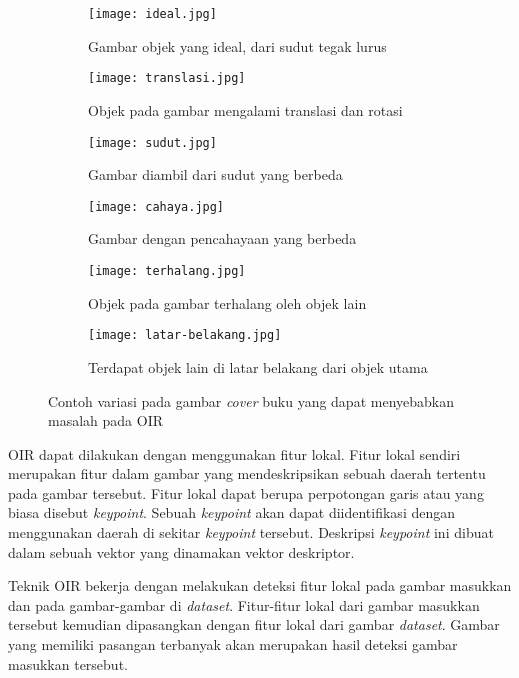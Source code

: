 \begin{figure}[H]
	\centering %
	\begin{subfigure}{0.3\textwidth}
		\texttt{[image: ideal.jpg]}
		\caption{Gambar objek yang ideal, dari sudut tegak lurus}
		\label{fig:oir_ideal}
	\end{subfigure}\hfil %
	\begin{subfigure}{0.3\textwidth}
		\texttt{[image: translasi.jpg]}
		\caption{Objek pada gambar mengalami translasi dan rotasi}
		\label{fig:oir_translasi}
	\end{subfigure}\hfil %
	\begin{subfigure}{0.3\textwidth}
		\texttt{[image: sudut.jpg]}
		\caption{Gambar diambil dari sudut yang berbeda}
		\label{fig:oir_sudut}
	\end{subfigure}\hfill
	
	\medskip
	\begin{subfigure}{0.3\textwidth}
		\texttt{[image: cahaya.jpg]}
		\caption{Gambar dengan pencahayaan yang berbeda}
		\label{fig:oir_cahaya}
	\end{subfigure}\hfil %
	\begin{subfigure}{0.3\textwidth}
		\texttt{[image: terhalang.jpg]}
		\caption{Objek pada gambar terhalang oleh objek lain}
		\label{fig:oir_terhalang}
	\end{subfigure}\hfil %
	\begin{subfigure}{0.3\textwidth}
		\texttt{[image: latar-belakang.jpg]}
		\caption{Terdapat objek lain di latar belakang dari objek utama}
		\label{fig:oir_latar-belakang}
	\end{subfigure}
	\caption{Contoh variasi pada gambar \textit{cover} buku yang dapat menyebabkan masalah pada OIR}
	\label{fig:images}
\end{figure}

OIR dapat dilakukan dengan menggunakan fitur lokal. Fitur lokal sendiri merupakan fitur dalam gambar yang mendeskripsikan sebuah daerah tertentu pada gambar tersebut. Fitur lokal dapat berupa perpotongan garis atau yang biasa disebut \textit{keypoint}. Sebuah \textit{keypoint} akan dapat diidentifikasi dengan menggunakan daerah di sekitar \textit{keypoint} tersebut. Deskripsi \textit{keypoint} ini dibuat dalam sebuah vektor yang dinamakan vektor deskriptor.

Teknik OIR bekerja dengan melakukan deteksi fitur lokal pada gambar masukkan dan pada gambar-gambar di \textit{dataset}. Fitur-fitur lokal dari gambar masukkan tersebut kemudian dipasangkan dengan fitur lokal dari gambar \textit{dataset}. Gambar yang memiliki pasangan terbanyak akan merupakan hasil deteksi gambar masukkan tersebut. 

